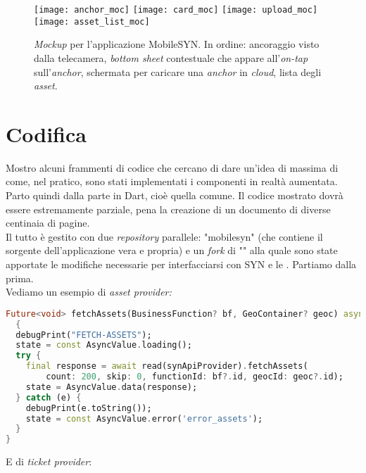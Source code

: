 \begin{figure}[H]
  \centering
  \texttt{[image: anchor\_moc]}\hfill
  \texttt{[image: card\_moc]}\hfill
  \texttt{[image: upload\_moc]}\hfill
  \texttt{[image: asset\_list\_moc]}
  \caption[\textit{App mockup} ]{\textit{Mockup} per l'applicazione MobileSYN. In ordine: ancoraggio visto dalla telecamera, \textit{bottom sheet} contestuale che appare all'\textit{on-tap} sull'\textit{anchor}, schermata per caricare una \textit{anchor} in \textit{cloud}, lista degli \textit{asset}.}
\end{figure}

\section{Codifica}
Mostro alcuni frammenti di codice che cercano di dare un'idea di massima di come, nel pratico, sono stati implementati i componenti in realtà aumentata. Parto quindi dalla parte in Dart, cioè quella comune. Il codice mostrato dovrà essere estremamente parziale, pena la creazione di un documento di diverse centinaia di pagine.\\
Il tutto è gestito con due \textit{repository} parallele: "mobilesyn" (che contiene il sorgente dell'applicazione vera e propria) e un \textit{fork} di "\aplug{}" alla quale sono state apportate le modifiche necessarie per interfacciarsi con SYN e le \asa{}. Partiamo dalla prima.\\
Vediamo un esempio di \textit{asset provider:}

\begin{lstlisting}[language=dart, label={lst:mobilesyn_asset_provider},firstnumber=1,caption={mobilesyn \textit{asset provider}}]
Future<void> fetchAssets(BusinessFunction? bf, GeoContainer? geoc) async 
  {
  debugPrint("FETCH-ASSETS");
  state = const AsyncValue.loading();
  try {
    final response = await read(synApiProvider).fetchAssets(
        count: 200, skip: 0, functionId: bf?.id, geocId: geoc?.id);
    state = AsyncValue.data(response);
  } catch (e) {
    debugPrint(e.toString());
    state = const AsyncValue.error('error_assets');
  }
}
\end{lstlisting} 

E di \textit{ticket provider}:

